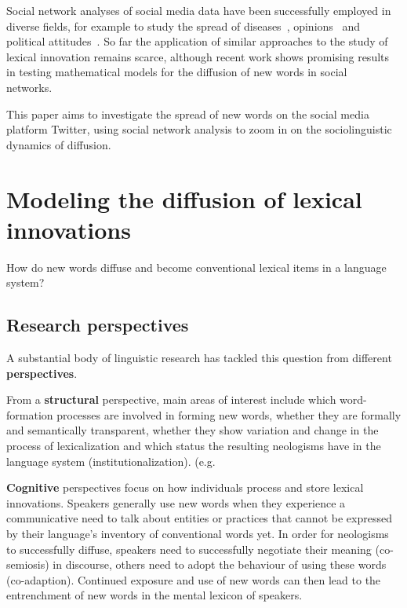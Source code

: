 \documentclass[a4paper]{scrartcl}
\renewcommand{\hw}[1]{\textbf{#1}}
\begin{document}
  Social network analyses of social media data have been successfully employed in diverse fields, for example to study the spread of diseases~\parencite{Lu2018}, opinions~\parencite{West2014} and political attitudes~\parencite{Pew-Research-Center2019}. So far the application of similar approaches to the study of lexical innovation remains scarce, although recent work shows promising results in testing mathematical models for the diffusion of new words in social networks.~\parencite{Goel2016}


  This paper aims to investigate the spread of new words on the social media platform Twitter, using social network analysis to zoom in on the sociolinguistic dynamics of diffusion.

\section{Modeling the diffusion of lexical innovations}

  How do new words diffuse and become conventional lexical items in a language system?

  \subsection{Research perspectives}

    A substantial body of linguistic research has tackled this question from different \hw{perspectives}. \parencite[16]{Schmid2016}

    From a \hw{structural} perspective, main areas of interest include which word-formation processes are involved in forming new words, whether they are formally and semantically transparent, whether they show variation and change in the process of lexicalization and which status the resulting neologisms have in the language system (institutionalization). (e.g. \cite{Bauer1983,Lipka2005}

    \hw{Cognitive} perspectives focus on how individuals process and store lexical innovations. Speakers generally use new words when they experience a communicative need to talk about entities or practices that cannot be expressed by their language's inventory of conventional words yet. In order for neologisms to successfully diffuse, speakers need to successfully negotiate their meaning (co-semiosis) in discourse, others need to adopt the behaviour of using these words (co-adaption). Continued exposure and use of new words can then lead to the entrenchment of new words in the mental lexicon of speakers.~\parencite{Schmid2008}
\end{document}
